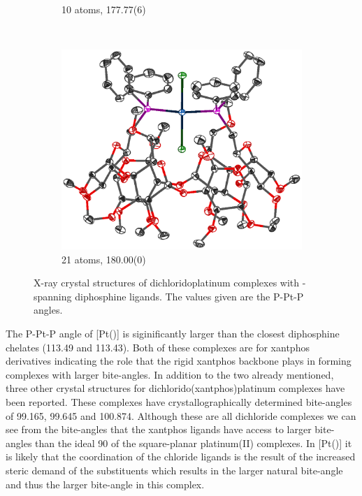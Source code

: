 \begin{figure}[htbp]
\begin{subfigure}[b]{0.32\textwidth}
                \caption{10 atoms, 177.77(6)\degrees}
                \label{WIBCIU}
        \end{subfigure}
        ~
        \begin{subfigure}[b]{0.32\textwidth}
                \includegraphics[width=\textwidth]{../Othercrystals/PtCl2/Trans/202109.eps}
                \caption{21 atoms, 180.00(0)\degrees}
                \label{OJUBAW}
        \end{subfigure}
        \caption[X-ray crystal structures of dichloridoplatinum complexes with \trans-spanning diphosphine ligands]{X-ray crystal structures of dichloridoplatinum complexes with \trans-spanning diphosphine ligands.  The values given are the P-Pt-P angles.}
        \label{crystal:transspanning}
        \end{figure}

The P-Pt-P angle of [Pt(\tButhixantphos)] is siginificantly larger than the closest \cis{} diphosphine chelates (113.49 and 113.43\degrees).  Both of these complexes are for xantphos derivatives indicating the role that the rigid xantphos backbone plays in forming complexes with larger bite-angles.\cite{Vlugt2003, Mora2008}  In addition to the two already mentioned, three other crystal structures for dichlorido(xantphos)platinum complexes have been reported.\cite{Duren2006, Duren2007, Niksch2010}  These complexes have crystallographically determined bite-angles of 99.165, 99.645 and 100.874.  Although these are all \cis{} dichloride complexes we can see from the bite-angles that the xantphos ligands have access to larger bite-angles than the ideal 90\degrees{} of the square-planar platinum(II) complexes.  In [Pt(\tButhixantphos)] it is likely that the \trans{} coordination of the chloride ligands is the result of the increased steric demand of the \tBu{} substituents which results in the larger natural bite-angle and thus the larger bite-angle in this complex.  

